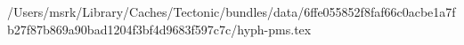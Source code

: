 /Users/msrk/Library/Caches/Tectonic/bundles/data/6ffe055852f8faf66c0acbe1a7fb27f87b869a90bad1204f3bf4d9683f597c7c/hyph-pms.tex